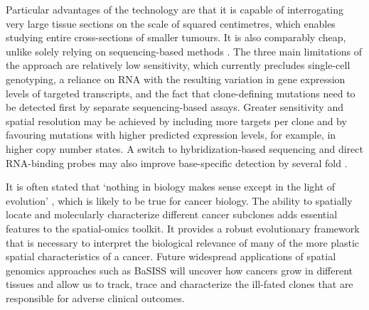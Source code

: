 Particular advantages of the technology are that it is capable of interrogating very large tissue sections on the scale of squared centimetres, which enables studying entire cross-sections of smaller tumours. It is also comparably cheap, unlike solely relying on sequencing-based methods \parencite{Vickovic2019-tz}. The three main limitations of the approach are relatively low sensitivity, which currently precludes single-cell genotyping, a reliance on RNA with the resulting variation in gene expression levels of targeted transcripts, and the fact that clone-defining mutations need to be detected first by separate sequencing-based assays. Greater sensitivity and spatial resolution may be achieved by including more targets per clone and by favouring mutations with higher predicted expression levels, for example, in higher copy number states. A switch to hybridization-based sequencing and direct RNA-binding probes may also improve base-specific detection by several fold \parencite{Gyllborg2020-uq,Lee2022-ha}.

It is often stated that `nothing in biology makes sense except in the light of evolution' \parencite{Dobzhansky1973-va}, which is likely to be true for cancer biology. The ability to spatially locate and molecularly characterize different cancer subclones adds essential features to the spatial-omics toolkit. It provides a robust evolutionary framework that is necessary to interpret the biological relevance of many of the more plastic spatial characteristics of a cancer. Future widespread applications of spatial genomics approaches such as \ac{BaSISS} will uncover how cancers grow in different tissues and allow us to track, trace and characterize the ill-fated clones that are responsible for adverse clinical outcomes.

